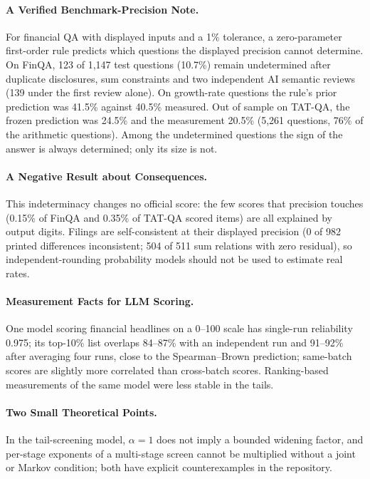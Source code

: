 \documentclass[11pt]{article}
\begin{document}
\paragraph{A Verified Benchmark-Precision Note.} For financial QA with displayed inputs and a 1\% tolerance, a zero-parameter first-order rule predicts which questions the displayed precision cannot determine. On FinQA, 123 of 1,147 test questions (10.7\%) remain undetermined after duplicate disclosures, sum constraints and two independent AI semantic reviews (139 under the first review alone). On growth-rate questions the rule's prior prediction was 41.5\% against 40.5\% measured. Out of sample on TAT-QA, the frozen prediction was 24.5\% and the measurement 20.5\% (5,261 questions, 76\% of the arithmetic questions). Among the undetermined questions the sign of the answer is always determined; only its size is not.

\paragraph{A Negative Result about Consequences.} This indeterminacy changes no official score: the few scores that precision touches (0.15\% of FinQA and 0.35\% of TAT-QA scored items) are all explained by output digits. Filings are self-consistent at their displayed precision (0 of 982 printed differences inconsistent; 504 of 511 sum relations with zero residual), so independent-rounding probability models should not be used to estimate real rates.

\paragraph{Measurement Facts for LLM Scoring.} One model scoring financial headlines on a 0--100 scale has single-run reliability 0.975; its top-10\% list overlaps 84--87\% with an independent run and 91--92\% after averaging four runs, close to the Spearman--Brown prediction; same-batch scores are slightly more correlated than cross-batch scores. Ranking-based measurements of the same model were less stable in the tails.

\paragraph{Two Small Theoretical Points.} In the tail-screening model, $\alpha=1$ does not imply a bounded widening factor, and per-stage exponents of a multi-stage screen cannot be multiplied without a joint or Markov condition; both have explicit counterexamples in the repository.
\end{document}
